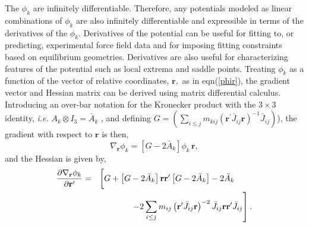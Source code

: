 \documentclass[12pt,thmsa]{article}
\begin{document}
The $\phi _k$ are infinitely differentiable. Therefore, any potentials
modeled as linear combinations of $\phi _k$ are also infinitely
differentiable and expressible in terms of the derivatives of the $\phi _k$.
Derivatives of the potential can be useful for fitting to, or predicting,
experimental force field data and for imposing fitting constraints based on
equilibrium geometries. Derivatives are also useful for characterizing
features of the potential such as local extrema and saddle points. Treating $%
\phi _k$ as a function of the vector of relative coordinates, $\mathbf{r,}$
as in eqn(\ref{phir}), the gradient vector and Hessian matrix can be derived
using matrix differential calculus\cite{Kinghorn95a}. Introducing an
over-bar notation for the Kronecker product with the $3\times 3$ identity, 
\textit{i.e.} $A_k\otimes I_3=\bar{A}_k\,\,$, and defining $G=\left(
\sum_{i\leq j}m_{kij}\left( \mathbf{r}^{\prime }\bar{J}_{ij}\mathbf{r}%
\right) ^{-1}\bar{J}_{ij}\right) $), the gradient with respect to $\mathbf{r}
$ is then, 
\begin{equation}
\nabla _{\mathbf{r}}\phi _k=\left[ G-2\bar{A}_k\right] \phi _k\,\mathbf{r,}
\end{equation}
and the Hessian is given by, 
\begin{eqnarray}
\frac{\partial \nabla _{\mathbf{r}}\phi _k}{\partial \mathbf{r}^{\prime }}
&=&\left[ G+\left[ G-2\bar{A}_k\right] \mathbf{rr}^{\prime }\left[ G-2\bar{A}%
_k\right] -2\bar{A}_k\mathstrut \strut 
\begin{array}{ll}
&  \\ 
& 
\end{array}
\right.  \nonumber \\
&&\left. -2\sum_{i\leq j}m_{ij}\left( \mathbf{r}^{\prime }\bar{J}_{ij}%
\mathbf{r}\right) ^{-2}\bar{J}_{ij}\mathbf{rr}^{\prime }\bar{J}_{ij}\right] .
\end{eqnarray}
\end{document}
